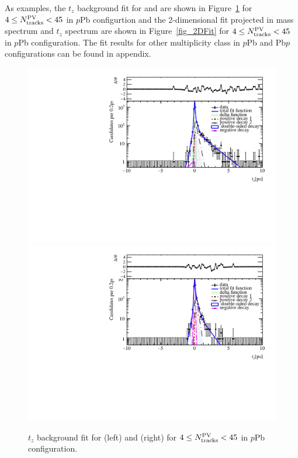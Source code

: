 As examples, the $t_z$ background fit for \jpsi and \psitwos are shown in Figure~\ref{fig_tzbkg} for $4\leq N_{\rm tracks}^{\rm PV} < 45$ in $p$Pb  configurtion and the 2-dimensional fit projected in mass spectrum and $t_z$ spectrum are shown in Figure~\ref{fig_2DFit} for $4\leq N_{\rm tracks}^{\rm PV} < 45$ in  $p$Pb configuration. The fit results for other multiplicity class in $p$Pb and Pb$p$ configurations can be found in appendix.
\begin{figure}[!tbp]
\begin{center}
\includegraphics[width=0.49\linewidth]{pdf/pPb/Workdir/TzbkgFit/Jpsi_n1y1pt1.pdf}
\includegraphics[width=0.49\linewidth]{pdf/pPb/Workdir/TzbkgFit/Psi2S_n1y1pt1.pdf}
\end{center}
\caption{
	$t_z$ background fit for \jpsi (left) and \psitwos (right) for $4\leq N_{\rm tracks}^{\rm PV} < 45$ in $p$Pb configuration.}
\label{fig_tzbkg}
\end{figure}
